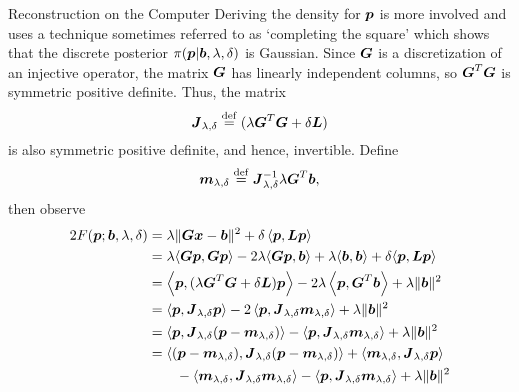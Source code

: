 \begin{chapter}{Reconstruction on the Computer}
Deriving the density for $\mbox{\boldmath$p$}$ is more involved and uses a technique sometimes referred to as `completing the square' \citep{stuart2010} which shows that the discrete posterior $\pi(\mbox{\boldmath$p$}|\mbox{\boldmath$b$},\lambda,\delta)$ is Gaussian.
Since $\mbox{\boldmath$G$}$ is a discretization of an injective operator, the matrix $\mbox{\boldmath$G$}$ has linearly independent columns, so $\mbox{\boldmath$G$}^T \mbox{\boldmath$G$}$ is symmetric positive definite.
Thus, the matrix 
\begin{equation} \label{eq:regularizationOperator}
  \mbox{\boldmath$J$}_{\lambda,\delta} \stackrel{\rm def}{=} (\lambda \mbox{\boldmath$G$}^T\mbox{\boldmath$G$} + \delta \mbox{\boldmath$L$})
\end{equation}
is also symmetric positive definite, and hence, invertible.
Define
\begin{equation} \label{eq:computeMAP}
  \mbox{\boldmath$m$}_{\lambda,\delta} \stackrel{\rm def}{=} \mbox{\boldmath$J$}_{\lambda,\delta}^{-1}\lambda \mbox{\boldmath$G$}^T\mbox{\boldmath$b$},
\end{equation} 
then observe
\begin{align}
  2F(\vect p; \vect b,\lambda,\delta) 
  &= \lambda\|\vect{Gx} - \vect b\|^2 + \delta\left\langle \vect p, \vect L \vect p\right\rangle \nonumber \\
  &= \lambda\langle \vect G\vect p,\vect G \vect p\rangle -2\lambda\langle \vect G\vect p,\vect b\rangle + \lambda\langle \vect b,\vect b\rangle + \delta \langle\vect p,\vect L\vect p\rangle \nonumber\\
  &= \left\langle \vect p,( \lambda \vect G^T \vect G + \delta \vect L)\vect p\right\rangle - 2 \lambda \left\langle \vect p, \vect G^T \vect b\right\rangle + \lambda \|\vect b\|^2\nonumber \\
  &= \left\langle \vect p,\vect J_{\lambda,\delta}\vect p\right\rangle - 2 \left\langle \vect p, \vect J_{\lambda,\delta}\vect m_{\lambda,\delta}\right\rangle + \lambda \|\vect b\|^2\nonumber \\
  &= \left\langle \vect p,\vect J_{\lambda,\delta}(\vect p - \vect m_{\lambda,\delta})\right\rangle - \left\langle \vect p, \vect J_{\lambda,\delta}\vect m_{\lambda,\delta}\right\rangle + \lambda \|\vect b\|^2\nonumber \\
  &= \left\langle (\vect p-\vect m_{\lambda,\delta}),\vect J_{\lambda,\delta}(\vect p - \vect m_{\lambda,\delta})\right \rangle  + \langle \vect m_{\lambda,\delta},\vect J_{\lambda,\delta}\vect p\rangle \nonumber\\
  &\quad\quad- \langle \vect m_{\lambda,\delta},\vect J_{\lambda,\delta}\vect m_{\lambda,\delta}\rangle - \left\langle \vect p, \vect J_{\lambda,\delta}\vect m_{\lambda,\delta}\right\rangle + \lambda \|\vect b\|^2\nonumber \\

\end{align}
\end{chapter}
